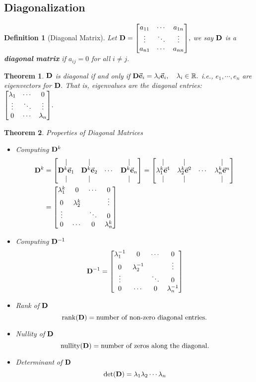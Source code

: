 \documentclass[12pt, a4paper]{article}
\newtheorem{thm}{Theorem}[subsection]
\newtheorem{df}{Definition}[subsection]
\def\R{{\mathbb{R}}}
\def\rank{\mathrm{rank}}
\def\nullity{\mathrm{nullity}}
\def\vece{\va{e}}
\def\matrixD{\vb{D}}
\begin{document}
\subsection{Diagonalization}
\begin{df}[Diagonal Matrix]
	Let $\matrixD=\mqty[a_{11}&\cdots&a_{1n}\\\vdots&\ddots&\vdots\\a_{n1}&\cdots&a_{nn}],$ we say $\matrixD$ is a \textbf{diagonal matrix} if $a_{ij}=0$ for all $i\neq j.$	
\end{df}
\begin{thm}
	$\matrixD$ is diagonal if and only if $\matrixD\vece_i=\lambda_i\vece_i,\quad\lambda_i\in\R.$ i.e., $e_1,\cdots,e_n$ are eigenvectors for $\matrixD.$ That is, eigenvalues are the diagonal entries: $\mqty[\lambda_1&\cdots&0\\\vdots&\ddots&\vdots\\0&\cdots&\lambda_n].$	
\end{thm}
\begin{thm}Properties of Diagonal Matrices
\begin{itemize}
	\item Computing $\matrixD^k$ \[\begin{aligned}\matrixD^k&=\mqty[|&|&&|\\\matrixD^k\vece_1&\matrixD^k\vece_2&\cdots&\matrixD^k\vece_n\\|&|&&|]=\mqty[|&|&&|\\\lambda_1^k\vece^1&\lambda_2^k\vece^2&\cdots&\lambda_n^k\vece^n\\|&|&&|]\\&=\mqty[\lambda_1^k&0&\cdots&0\\0&\lambda_2^k&&\vdots\\\vdots&&\ddots&0\\0&\cdots&0&\lambda_n^k]\end{aligned}\]
	\item Computing $\matrixD^{-1}$ \[\matrixD^{-1}=\mqty[\lambda_1^{-1}&0&\cdots&0\\0&\lambda_2^{-1}&&\vdots\\\vdots&&\ddots&0\\0&\cdots&0&\lambda_n^{-1}]\]
	\item Rank of $\matrixD$ \[\rank(\matrixD)=\text{number of non-zero diagonal entries.}\]
	\item Nullity of $\matrixD$ \[\nullity(\matrixD)=\text{number of zeros along the diagonal}.\]
	\item Determinant of $\matrixD$ \[\det(\matrixD)=\lambda_1\lambda_2\cdots\lambda_n\]
\end{itemize}
\end{thm}
\end{document}
